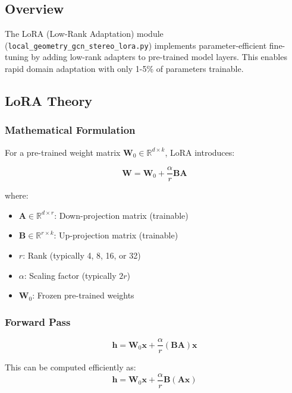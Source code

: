 \documentclass[11pt,a4paper]{article}
\begin{document}
\subsection{Overview}

The LoRA (Low-Rank Adaptation) module (\texttt{local\_geometry\_gcn\_stereo\_lora.py}) implements parameter-efficient fine-tuning by adding low-rank adapters to pre-trained model layers. This enables rapid domain adaptation with only 1-5\% of parameters trainable.

\subsection{LoRA Theory}

\subsubsection{Mathematical Formulation}

For a pre-trained weight matrix $\mathbf{W}_0 \in \mathbb{R}^{d \times k}$, LoRA introduces:

\begin{equation}
\mathbf{W} = \mathbf{W}_0 + \frac{\alpha}{r} \mathbf{B} \mathbf{A}
\end{equation}

where:
\begin{itemize}
    \item $\mathbf{A} \in \mathbb{R}^{d \times r}$: Down-projection matrix (trainable)
    \item $\mathbf{B} \in \mathbb{R}^{r \times k}$: Up-projection matrix (trainable)
    \item $r$: Rank (typically 4, 8, 16, or 32)
    \item $\alpha$: Scaling factor (typically $2r$)
    \item $\mathbf{W}_0$: Frozen pre-trained weights
\end{itemize}

\subsubsection{Forward Pass}

\begin{equation}
\mathbf{h} = \mathbf{W}_0 \mathbf{x} + \frac{\alpha}{r} (\mathbf{B} \mathbf{A}) \mathbf{x}
\end{equation}

This can be computed efficiently as:
\begin{equation}
\mathbf{h} = \mathbf{W}_0 \mathbf{x} + \frac{\alpha}{r} \mathbf{B} (\mathbf{A} \mathbf{x})
\end{equation}
\end{document}
